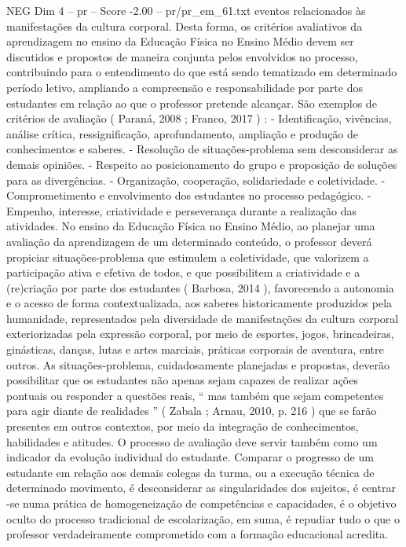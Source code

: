 \begin{textsample}{NEG Dim 4 – pr – Score -2.00 – pr/pr\_em\_61.txt}
eventos relacionados às manifestações da cultura corporal.
Desta forma, os critérios avaliativos da aprendizagem no ensino da Educação Física no Ensino Médio devem ser discutidos e propostos de maneira conjunta pelos envolvidos no processo, contribuindo para o entendimento do que está sendo tematizado em determinado período letivo, ampliando a compreensão e responsabilidade por parte dos estudantes em relação ao que o professor pretende alcançar.
São exemplos de critérios de avaliação ( Paraná, 2008 ; Franco, 2017 ) : - Identificação, vivências, análise crítica, ressignificação, aprofundamento, ampliação e produção de conhecimentos e saberes. - Resolução de situações-problema sem desconsiderar as demais opiniões. - Respeito ao posicionamento do grupo e proposição de soluções para as divergências. - Organização, cooperação, solidariedade e coletividade. - Comprometimento e envolvimento dos estudantes no processo pedagógico. - Empenho, interesse, criatividade e perseverança durante a realização das atividades.
No ensino da Educação Física no Ensino Médio, ao planejar uma avaliação da aprendizagem de um determinado conteúdo, o professor deverá propiciar situações-problema que estimulem a coletividade, que valorizem a participação ativa e efetiva de todos, e que possibilitem a criatividade e a (re)criação por parte dos estudantes ( Barbosa, 2014 ), favorecendo a autonomia e o acesso de forma contextualizada, aos saberes historicamente produzidos pela humanidade, representados pela diversidade de manifestações da cultura corporal exteriorizadas pela expressão corporal, por meio de esportes, jogos, brincadeiras, ginásticas, danças, lutas e artes marciais, práticas corporais de aventura, entre outros.
As situações-problema, cuidadosamente planejadas e propostas, deverão possibilitar que os estudantes não apenas sejam capazes de realizar ações pontuais ou responder a questões reais, “ mas também que sejam competentes para agir diante de realidades ” ( Zabala ; Arnau, 2010, p. 216 ) que se farão presentes em outros contextos, por meio da integração de conhecimentos, habilidades e atitudes.
O processo de avaliação deve servir também como um indicador da evolução individual do estudante.
Comparar o progresso de um estudante em relação aos demais colegas da turma, ou a execução técnica de determinado movimento, é desconsiderar as singularidades dos sujeitos, é centrar -se numa prática de homogeneização de competências e capacidades, é o objetivo oculto do processo tradicional de escolarização, em suma, é repudiar tudo o que o professor verdadeiramente comprometido com a formação educacional acredita.

\end{textsample}
